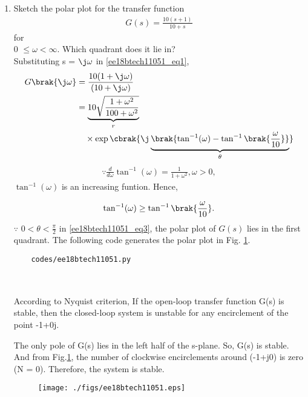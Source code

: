 \begin{enumerate}[label=\thesection.\arabic*.,ref=\thesection.\theenumi]


\item  Sketch the polar plot for the transfer function
\begin{align}
\label{ee18btech11051_eq1}
     G(s) = \frac{10(s+1)}{10+s}
\end{align} for \\0 $\leq \omega < \infty$.
Which quadrant does it lie in?
\\
\solution Substituting s = $\j \omega$ in \eqref{ee18btech11051_eq1},
\begin{align}
\label{ee18btech11051_eq2}
G\brak{\j\omega} &= \frac{10(1+\j\omega)}{(10+\j\omega)}\\
 \label{ee18btech11051_eq3}
&= \underbrace{10\sqrt{\frac{1+\omega^2}{100+\omega^2}}}_{r}
\nonumber \\
&\quad \times \exp\cbrak{\j\underbrace{\brak{\tan^{-1}(\omega)-\tan^{-1}\brak{\frac{\omega}{10}}}}_{\theta}}
\end{align}
%
\begin{align}
\because \frac{d}{d\omega}\tan^{-1}(\omega) = \frac{1}{1+\omega^2}, \omega > 0,
\end{align}
%
$\tan^{-1}(\omega) $ is an increasing funtion.  Hence, 

\begin{align}
\tan^{-1}(\omega) \geq \tan^{-1}\brak{\frac{\omega}{10}}.
\end{align}
$\because $ $0 < \theta < \frac{\pi}{2}$ in \eqref{ee18btech11051_eq3}, the polar plot of $G(s)$ lies in the first quadrant. The following code generates the polar plot in Fig.       \ref{fig:ee18btech11051_fig1}.

\begin{lstlisting}
    codes/ee18btech11051.py
    
\end{lstlisting}
%
\\
According to Nyquist criterion, If the open-loop transfer function G(s) is stable, then the closed-loop system is unstable for  any  encirclement  of  the  point  -1+0j.

The only pole of G(s) lies in the left half of the s-plane. So, G(s) is stable. And from Fig.\ref{fig:ee18btech11051_fig1}, the number of clockwise encirclements around (-1+j0) is zero (N = 0). Therefore, the system is stable. 



      \begin{figure}[!h]
      \centering
      \texttt{[image: ./figs/ee18btech11051.eps]}
      \caption{}
      \label{fig:ee18btech11051_fig1}
      \end{figure}



\end{enumerate}
